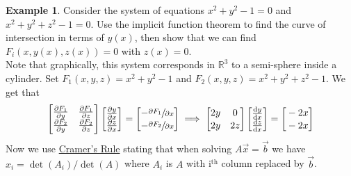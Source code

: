 \documentclass[
	12pt,
	]{article}
\newcommand{\R}{\mathbb{R}}
\theoremstyle{custom}
\theoremstyle{custom}
\theoremstyle{custom}
\theoremstyle{custom}
\theoremstyle{custom}
\theoremstyle{definition}
\newtheorem{example}{Example}[section]
\theoremstyle{example}
\theoremstyle{note}
\theoremstyle{remark}
\theoremstyle{example}
\newcounter{theo}[section]\setcounter{theo}{0}
\numberwithin{equation}{subsection}
\begin{document}
	   		 \begin{example}
	   		 	Consider the system of equations $x^{2} + y^{2} -1 = 0$ and $x^{2} + y^{2} + z^{2} -1 =0$. Use the implicit function theorem to find the curve of intersection in terms of $y(x)$, then show that we can find $F_{i}(x,y(x), z(x)) = 0 $ with $z(x) =0 $.\\
	   		 	
	   		 	\noindent Note that graphically, this system corresponds in $\R^{3}$ to a semi-sphere inside a cylinder.
	   		 	Set $F_{1}(x,y,z) = x^{2} + y^{2} -1 $ and $F_{2}(x,y,z) = x^{2} + y^{2} +z^{2} -1$. We get that 
	   		 	\begin{equation*}
	   		 		\begin{bmatrix}
	   		 		\strut \pdv{F_{1}}{y} & \strut \pdv{F_{1}}{z} \\
	   		 			\strut \pdv{F_{2}}{y} &\strut\pdv{F_{2}}{z}
	   		 		\end{bmatrix}
	   		 		\begin{bmatrix}
		   		 		\pdv{y}{x} \\
		   		 		\pdv{z}{x}
	   		 		\end{bmatrix}
	   		 		=
	   		 		\begin{bmatrix}
	   		 			- \vphantom{\pdv{y}{x}}\sfrac{\partial F_{1}}{\partial x}\\
	   		 			- \vphantom{\pdv{y}{x}}\sfrac{\partial F_{2}}{ \partial x}
	   		 		\end{bmatrix} \implies 
	   		 		\begin{bmatrix}
	   		 			\vphantom{\pdv{y}{x}}2y & \vphantom{\pdv{y}{x}}0 \\
	   		 			\vphantom{\pdv{y}{x}}2y &\vphantom{\pdv{y}{x}} 2z
	   		 		\end{bmatrix}
	   		 		\begin{bmatrix}
	   		 			 \dv{y}{x} \\
	   		 			 \dv{z}{x}
	   		 		\end{bmatrix}
	   		 		=
	   		 		\begin{bmatrix}
	   		 			\vphantom{\pdv{y}{x}}-2x \\
	   		 			\vphantom{\pdv{y}{x}}-2x
	   		 		\end{bmatrix}
	   		 	\end{equation*}
	   		 	Now we use \underline{Cramer's Rule} stating that when solving $A\vec{x} = \vec{b}$ we have $x_{i} = \det(A_{i}) / \det(A)$ where $A_{i}$ is $A$ with i$^{\text{th}}$ column replaced by $\vec{b}$.
	   		 	\begin{equation*}

\end{equation*}
\end{example}
\end{document}

